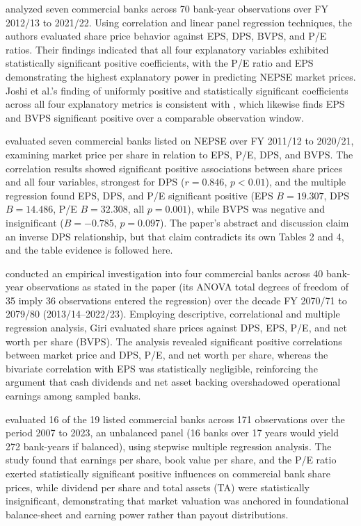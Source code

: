 \citet{joshi2023} analyzed seven commercial banks across 70 bank-year observations over FY 2012/13 to 2021/22. Using correlation and linear panel regression techniques, the authors evaluated share price behavior against EPS, DPS, BVPS, and P/E ratios. Their findings indicated that all four explanatory variables exhibited statistically significant positive coefficients, with the P/E ratio and EPS demonstrating the highest explanatory power in predicting NEPSE market prices. Joshi et al.'s finding of uniformly positive and statistically significant coefficients across all four explanatory metrics is consistent with \citet{chhetri2023}, which likewise finds EPS and BVPS significant positive over a comparable observation window.

\citet{lamsal2024} evaluated seven commercial banks listed on NEPSE over FY 2011/12 to 2020/21, examining market price per share in relation to EPS, P/E, DPS, and BVPS. The correlation results showed significant positive associations between share prices and all four variables, strongest for DPS ($r = 0.846$, $p < 0.01$), and the multiple regression found EPS, DPS, and P/E significant positive (EPS $B = 19.307$, DPS $B = 14.486$, P/E $B = 32.308$, all $p = 0.001$), while BVPS was negative and insignificant ($B = -0.785$, $p = 0.097$). The paper's abstract and discussion claim an inverse DPS relationship, but that claim contradicts its own Tables 2 and 4, and the table evidence is followed here.

\citet{giri2024} conducted an empirical investigation into four commercial banks across 40 bank-year observations as stated in the paper (its ANOVA total degrees of freedom of 35 imply 36 observations entered the regression) over the decade FY 2070/71 to 2079/80 (2013/14--2022/23). Employing descriptive, correlational and multiple regression analysis, Giri evaluated share prices against DPS, EPS, P/E, and net worth per share (BVPS). The analysis revealed significant positive correlations between market price and DPS, P/E, and net worth per share, whereas the bivariate correlation with EPS was statistically negligible, reinforcing the argument that cash dividends and net asset backing overshadowed operational earnings among sampled banks.

\citet{gurung2024} evaluated 16 of the 19 listed commercial banks across 171 observations over the period 2007 to 2023, an unbalanced panel (16 banks over 17 years would yield 272 bank-years if balanced), using stepwise multiple regression analysis. The study found that earnings per share, book value per share, and the P/E ratio exerted statistically significant positive influences on commercial bank share prices, while dividend per share and total assets (TA) were statistically insignificant, demonstrating that market valuation was anchored in foundational balance-sheet and earning power rather than payout distributions.

